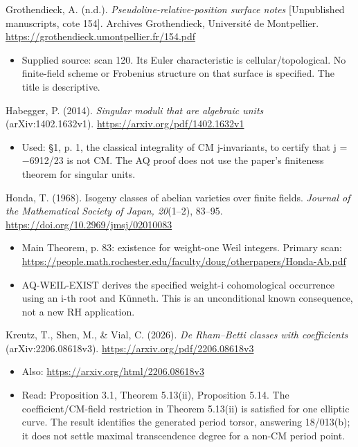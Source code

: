 \documentclass[11pt,a4paper]{article}
\providecommand{\tightlist}{\setlength{\itemsep}{0pt}\setlength{\parskip}{0pt}}
\theoremstyle{definition}\newtheorem{definition}[theorem]{Definition}
\theoremstyle{remark}\newtheorem{remark}[theorem]{Remark}
\begin{document}
Grothendieck, A. (n.d.). \emph{Pseudoline-relative-position surface
notes} {[}Unpublished manuscripts, cote 154{]}. Archives Grothendieck,
Université de Montpellier.
\url{https://grothendieck.umontpellier.fr/154.pdf}

\begin{itemize}
\tightlist
\item
  Supplied source: scan 120. Its Euler characteristic is
  cellular/topological. No finite-field scheme or Frobenius structure on
  that surface is specified. The title is descriptive.
\end{itemize}

Habegger, P. (2014). \emph{Singular moduli that are algebraic units}
(arXiv:1402.1632v1). \url{https://arxiv.org/pdf/1402.1632v1}

\begin{itemize}
\tightlist
\item
  Used: §1, p. 1, the classical integrality of CM j-invariants, to
  certify that j = −6912/23 is not CM. The AQ proof does not use the
  paper's finiteness theorem for singular units.
\end{itemize}

Honda, T. (1968). Isogeny classes of abelian varieties over finite
fields. \emph{Journal of the Mathematical Society of Japan, 20}(1--2),
83--95. \url{https://doi.org/10.2969/jmsj/02010083}

\begin{itemize}
\tightlist
\item
  Main Theorem, p. 83: existence for weight-one Weil integers. Primary
  scan:
  \url{https://people.math.rochester.edu/faculty/doug/otherpapers/Honda-Ab.pdf}
\item
  AQ-WEIL-EXIST derives the specified weight-i cohomological occurrence
  using an i-th root and Künneth. This is an unconditional known
  consequence, not a new RH application.
\end{itemize}

Kreutz, T., Shen, M., \& Vial, C. (2026). \emph{De Rham--Betti classes
with coefficients} (arXiv:2206.08618v3).
\url{https://arxiv.org/pdf/2206.08618v3}

\begin{itemize}
\tightlist
\item
  Also: \url{https://arxiv.org/html/2206.08618v3}
\item
  Read: Proposition 3.1, Theorem 5.13(ii), Proposition 5.14. The
  coefficient/CM-field restriction in Theorem 5.13(ii) is satisfied for
  one elliptic curve. The result identifies the generated period torsor,
  answering 18/013(b); it does not settle maximal transcendence degree
  for a non-CM period point.
\end{itemize}
\end{document}

